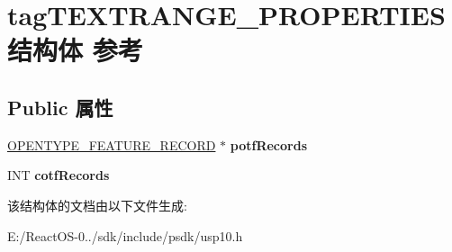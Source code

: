 \hypertarget{structtag_t_e_x_t_r_a_n_g_e___p_r_o_p_e_r_t_i_e_s}{}\section{tag\+T\+E\+X\+T\+R\+A\+N\+G\+E\+\_\+\+P\+R\+O\+P\+E\+R\+T\+I\+E\+S结构体 参考}
\label{structtag_t_e_x_t_r_a_n_g_e___p_r_o_p_e_r_t_i_e_s}
\subsection*{Public 属性}
\begin{DoxyCompactItemize}
\item 
\mbox{\label{structtag_t_e_x_t_r_a_n_g_e___p_r_o_p_e_r_t_i_e_s_adbdd490f1c8ea32965af852439821d8f}} 
\hyperlink{structtag_o_p_e_n_t_y_p_e___f_e_a_t_u_r_e___r_e_c_o_r_d}{O\+P\+E\+N\+T\+Y\+P\+E\+\_\+\+F\+E\+A\+T\+U\+R\+E\+\_\+\+R\+E\+C\+O\+RD} $\ast$ {\bfseries potf\+Records}
\item 
\mbox{\label{structtag_t_e_x_t_r_a_n_g_e___p_r_o_p_e_r_t_i_e_s_acc1b1ab8c2a9b035ddbb1b439862df1d}} 
I\+NT {\bfseries cotf\+Records}
\end{DoxyCompactItemize}


该结构体的文档由以下文件生成\+:\begin{DoxyCompactItemize}
\item 
E\+:/\+React\+O\+S-\/0../sdk/include/psdk/usp10.\+h\end{DoxyCompactItemize}
